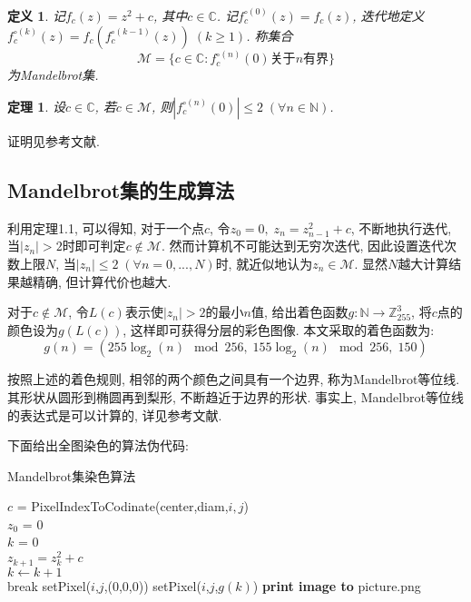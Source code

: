 \documentclass[UTF8]{ctexart}
\newtheorem{theorem}{定理}[section]  %
\newtheorem{definition}{定义}
\begin{document}
\begin{definition}
    记$f_c(z)=z^2+c$, 其中$c\in\mathbb{C}$. 记$f_c^{\circ(0)}(z)=f_c(z)$, 迭代地定义$f^{\circ(k)}_c(z)=f_c(f^{\circ(k-1)}_c(z))\;(k\geq 1)$. 称集合
    \begin{equation*}
        \mathcal{M}=\{c\in\mathbb{C}:f_c^{\circ(n)}(0)\text{关于}n\text{有界}\}
    \end{equation*}
    为Mandelbrot集.
\end{definition}

\begin{theorem}
    设$c\in\mathbb{C}$, 若$c\in\mathcal{M}$, 则$|f_c^{\circ(n)}(0)|\leq 2\;(\forall n\in\mathbb{N})$.
\end{theorem}

证明见参考文献\cite{branner1989mandelbrot}.

\subsection{Mandelbrot集的生成算法}

利用定理1.1, 可以得知, 对于一个点$c$, 令$z_0=0,\;z_n=z_{n-1}^2+c$, 不断地执行迭代, 当$|z_n|>2$时即可判定$c\notin \mathcal{M}$. 然而计算机不可能达到无穷次迭代, 因此设置迭代次数上限$N$, 当$|z_n|\leq 2\;(\forall n=0,...,N)$时, 就近似地认为$z_n\in \mathcal{M}$. 显然$N$越大计算结果越精确, 但计算代价也越大. 

对于$c\notin \mathcal{M}$, 令$L(c)$表示使$|z_n|>2$的最小$n$值, 给出着色函数$g:\mathbb{N} \to \mathbb{Z}_{255}^3$, 将$c$点的颜色设为$g(L(c))$, 这样即可获得分层的彩色图像. 本文采取的着色函数为: 
\begin{equation*}
    g(n)=(255\log_2(n)\mod 256,\;155\log_2(n)\mod 256,\;150)
\end{equation*}

按照上述的着色规则, 相邻的两个颜色之间具有一个边界, 称为Mandelbrot等位线. 其形状从圆形到椭圆再到梨形, 不断趋近于边界的形状. 事实上, Mandelbrot等位线的表达式是可以计算的, 详见参考文献\cite{张国栋2005Mandelbrot}.

下面给出全图染色的算法伪代码: 

\begin{algorithm}[H]
	\caption{Mandelbrot集染色算法}
	\small
	
	{
        {
            $c$ = PixelIndexToCodinate(center,diam,$i,j$)\\
            $z_0$ = 0\\
            $k$ = 0\\
            {
                $z_{k+1}=z_k^2+c$\\
                $k\gets k+1$\\
                {
                    break
                }
            }
            {
                setPixel($i$,$j$,(0,0,0))
            }
            {
                setPixel($i$,$j$,$g(k)$)
            }
        }
	}
    \textbf{print image to} picture.png
\end{algorithm}
\end{document}
